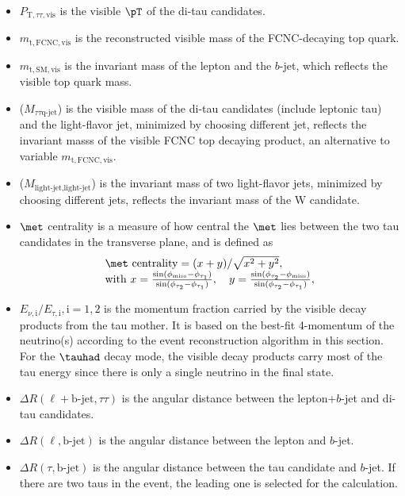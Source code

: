 \begin{itemize}
\item $P_{\text{T},\tau\tau,\text{vis}}$ is the visible $\pT$ of the di-tau candidates.
\item $m_{\text{t},\text{FCNC},\text{vis}}$ is the reconstructed visible mass of the FCNC-decaying top quark.
\item $m_{\text{t},\text{SM},\text{vis}}$ is the invariant mass of the lepton and the $b$-jet, which reflects the visible top quark mass.
\item {}($M_{\tau\tau \text{q-jet}}$) is the visible mass of the di-tau candidates (include leptonic tau) and the light-flavor jet, minimized by choosing different jet, reflects the invariant masss of the visible FCNC top decaying product, an alternative to variable $m_{\text{t},\text{FCNC},\text{vis}}$.
\item {}($M_{\text{light-jet},\text{light-jet}}$) is the invariant mass of two light-flavor jets, minimized by choosing different jets, reflects the invariant mass of the W candidate.
\item $\met$ centrality is a measure of how central the $\met$ lies between the two tau candidates in the transverse plane, and is defined as
\begin{eqnarray}
\begin{array}{l}
\met~\text{centrality} = {(x+y)}/{\sqrt{x^2+y^2}}, \\
\text{with}~x=\frac{\sin(\phi_{\text{miss}}-\phi_{\tau_1})}{\sin(\phi_{\tau_2}-\phi_{\tau_1})}, \quad  y=\frac{\sin(\phi_{\tau_2}-\phi_{\text{miss}})}{\sin(\phi_{\tau_2}-\phi_{\tau_1})} ,
\end{array}
\label{eq:eq3}
\end{eqnarray}
\item $E_{\nu,\text{i}}/E_{\tau,\text{i}},\text{i}=1,2$ is the momentum fraction carried by the visible decay products from the tau mother. It is based on the best-fit 4-momentum of the neutrino(s) according to the event reconstruction algorithm in this section. For the $\tauhad$ decay mode, the visible decay products carry most of the tau energy since there is only a single neutrino in the final state.%
\item $\Delta R(\ell+\text{b-jet},\tau\tau)$ is the angular distance between the lepton+$b$-jet and di-tau candidates.
\item $\Delta R(\ell,\text{b-jet})$ is the angular distance between the lepton and $b$-jet.
\item $\Delta R(\tau,\text{b-jet})$ is the angular distance between the tau candidate and $b$-jet. If there are two taus in the event, the leading one is selected for the calculation.

\end{itemize}
